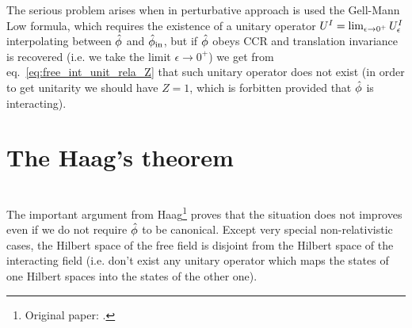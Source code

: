 \documentclass[../main/main.tex]{subfiles}
\begin{document}
The serious problem arises when in perturbative approach is used the Gell-Mann Low formula, which requires the existence of a unitary operator $U^I=\lim_{\epsilon\to0^+}\uei$ interpolating between $\hat{\phi}$ and $\hat{\phi}_{\text{in}}$, but if $\hat{\phi}$ obeys CCR and translation invariance is recovered (i.e. we take the limit $\epsilon\to0^+$) we get from eq.~\eqref{eq:free_int_unit_rela_Z}  that such unitary operator does not exist (in order to get unitarity we should have $Z=1$, which is forbitten provided that $\hat{\phi}$ is interacting).

\section{The Haag's theorem}

\cite[Section 3]{Earman:2005}\\

The important argument from Haag\footnote{Original paper: \cite{Haag:1955}.} proves that the situation does not improves even if we do not require $\hat{\phi}$ to be canonical. Except very special non-relativistic cases, the Hilbert space of the free field is disjoint from the Hilbert space of the interacting field (i.e. don't exist any unitary operator which maps the states of one Hilbert spaces into the states of the other one). 
\end{document}

